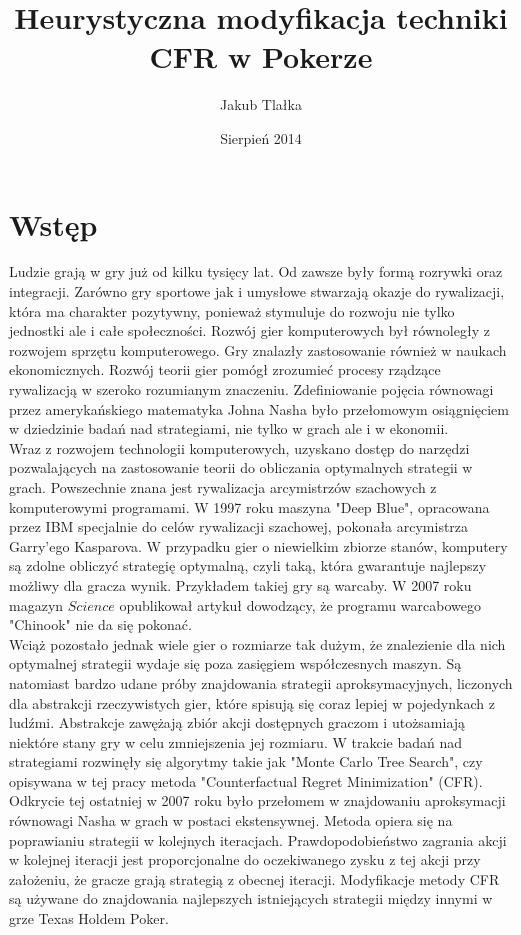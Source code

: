 \documentclass[licencjacka]{pracamgr}
\author{Jakub Tlałka}
\title{Heurystyczna modyfikacja techniki CFR w Pokerze}
\date{Sierpień 2014}
\begin{document}
\maketitle

\begin{abstract}
\end{abstract}

\tableofcontents

\chapter{Wstęp}

\noindent
Ludzie grają w gry już od kilku tysięcy lat. Od zawsze były formą rozrywki oraz integracji.
Zarówno gry sportowe jak i umysłowe stwarzają okazje do rywalizacji, która ma charakter pozytywny, ponieważ
stymuluje do rozwoju nie tylko jednostki ale i całe społeczności. Rozwój gier komputerowych był równoległy
z rozwojem sprzętu komputerowego. Gry znalazły zastosowanie również w naukach
ekonomicznych. Rozwój teorii gier pomógł zrozumieć procesy rządzące rywalizacją w szeroko rozumianym
znaczeniu. Zdefiniowanie pojęcia równowagi przez amerykańskiego matematyka Johna Nasha było przełomowym
osiągnięciem w dziedzinie badań nad strategiami, nie tylko w grach ale i w ekonomii. \\

\noindent
Wraz z rozwojem technologii komputerowych, uzyskano dostęp do narzędzi pozwalających na zastosowanie
teorii do obliczania optymalnych strategii w grach. Powszechnie znana jest rywalizacja
arcymistrzów szachowych z komputerowymi programami. W 1997 roku maszyna "Deep Blue", opracowana przez IBM
specjalnie do celów rywalizacji szachowej, pokonała arcymistrza Garry'ego Kasparova. W przypadku gier
o niewielkim zbiorze stanów, komputery są zdolne obliczyć strategię optymalną, czyli taką, która
gwarantuje najlepszy możliwy dla gracza wynik. Przykładem takiej gry są warcaby. W 2007
roku magazyn $Science$ opublikował artykuł dowodzący, że programu warcabowego "Chinook" nie da się pokonać. \\

\noindent
Wciąż pozostało jednak wiele gier o rozmiarze tak dużym, że znalezienie dla nich optymalnej strategii wydaje
się poza zasięgiem współczesnych maszyn. Są natomiast bardzo udane próby znajdowania strategii aproksymacyjnych,
liczonych dla abstrakcji rzeczywistych gier, które spisują się coraz lepiej w pojedynkach z ludźmi.
Abstrakcje zawężają zbiór akcji dostępnych graczom i utożsamiają niektóre stany gry w celu zmniejszenia jej rozmiaru.
W trakcie badań nad strategiami rozwinęły się algorytmy takie jak "Monte Carlo Tree Search", czy opisywana
w tej pracy metoda "Counterfactual Regret Minimization" (CFR). Odkrycie tej ostatniej w 2007 roku \cite{cfr} było przełomem
w znajdowaniu aproksymacji równowagi Nasha w grach w postaci ekstensywnej. Metoda opiera się na poprawianiu strategii w kolejnych
iteracjach. Prawdopodobieństwo zagrania akcji w kolejnej iteracji jest proporcjonalne do oczekiwanego zysku z tej akcji
przy założeniu, że gracze grają strategią z obecnej iteracji. Modyfikacje metody CFR są używane
do znajdowania najlepszych istniejących strategii między innymi w grze Texas Holdem Poker. \\
\end{document}
